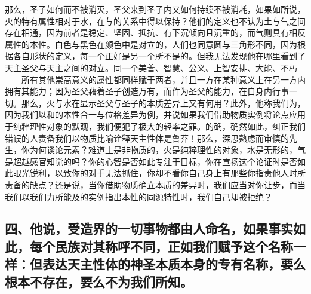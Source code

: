 那么，圣子如何而不被消灭，圣父来到圣子内又如何持续不被消耗，如果如所说，火的特有属性相对于水，在与的关系中得以保持？他们的定义也不认为土与气之间存在相通，因为前者是稳定、坚固、抵抗、有下沉倾向且沉重的，而气则具有相反属性的本性。白色与黑色在颜色中是对立的，人们也同意圆与三角形不同，因为根据各自形状的定义，每一个正好是另一个所不是的。但我无法发现他在哪里看到了天主圣父与天主之间的对立。同一个美善、智慧、公义、上智安排、大能、不朽——所有其他崇高意义的属性都同样赋于两者，并且一方在某种意义上在另一方内拥有其能力；因为圣父藉着圣子创造万有，而作为圣父的能力，在自身内行事一切。那么，火与水在显示圣父与圣子的本质差异上又有何用？此外，他称我们为，因为我们以和的本性合一与位格差异为例，并说如果我们借助物质实例将论点应用于纯粹理性对象的默观，我们便犯了极大的轻率之罪。的确，确然如此，纠正我们错误的人责备我们以物质比喻诠释天主性体是鲁莽！那么，深思熟虑而审慎的先生，你为何谈论元素？难道土是非物质的，火是纯粹理性的对象，水是无形的，气是超越感官知觉的吗？你的心智是否如此专注于目标，你在宣扬这个论证时是否如此眼光锐利，以致你的对手无法抓住，你却不看你自己身上有那些你指责他人时所责备的缺点？还是说，当你借助物质确立本质的差异时，我们应当对你让步，而当我们以我们力所能及的实例指出本性的同源特性时，我们自己却被拒绝？\par


\subsection{四、他说，受造界的一切事物都由人命名，如果事实如此，每个民族对其称呼不同，正如我们赋予这个名称一样：但表达天主性体的神圣本质本身的专有名称，要么根本不存在，要么不为我们所知。}

